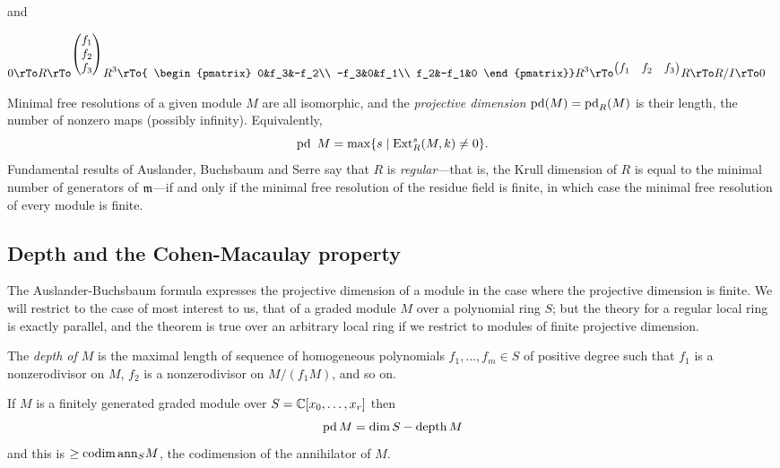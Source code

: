 
and

$$
\begin{aligned}
0\rTo R \rTo^{
\begin{pmatrix}
f_1\\f_2\\f_3
\end{pmatrix}} R^3&\rTo{
\begin{pmatrix}
 0&f_3&-f_2\\
 -f_3&0&f_1\\
 f_2&-f_1&0
\end{pmatrix}}
 R^3\rTo^{
 \begin{pmatrix}
f_1&f_2&f_3
\end{pmatrix}}R \rTo R/I \rTo 0
\end{aligned}
$$

Minimal free resolutions of a given module $M$ are all isomorphic, and the \emph{projective dimension}  $\operatorname{pd}(M) = \operatorname{pd}_R(M)$ is their length, the number of nonzero
maps (possibly infinity). Equivalently, 
$$
\operatorname{pd}\ M = \max\{s \mid {\rm{Ext}}_R^s(M,k) \neq 0 \}.
$$
Fundamental
results of Auslander, Buchsbaum and Serre say that $R$ is \emph{regular}---that is, the Krull dimension of $R$ is equal to the minimal number
of generators of $\mathfrak m$---if and only if the minimal free resolution of the residue field is finite, in which case
the minimal free resolution of every module is finite. 

\subsection{Depth and the Cohen-Macaulay property}
The Auslander-Buchsbaum formula expresses the projective dimension of a module in the case where the projective dimension is finite. We will restrict to the case of most interest to us, that of a graded module $M$ over a polynomial ring $S$; but the
theory for a regular local ring is exactly parallel, and the theorem is true over an arbitrary local ring if we restrict to modules of finite projective dimension.

\begin{definition}
 The \emph{depth of $M$} is the maximal length of sequence of homogeneous polynomials $f_1,\dots,f_m \in S$ of positive degree such that $f_1$ is a nonzerodivisor on $M$, $f_2$ is a nonzerodivisor on $M/(f_1M)$, and so on. 
\end{definition}

\begin{theorem}\label{AB formula}
If $M$ is a finitely generated graded module over $S = {\mathbb C}[x_0,\dots, x_r]$  then
$$
\operatorname{pd} M = \dim S - \operatorname{depth} M
$$
and this is $\geq \operatorname{codim} {\rm{ann}}_S M$, the codimension of the annihilator of $M$.
\end{theorem}


